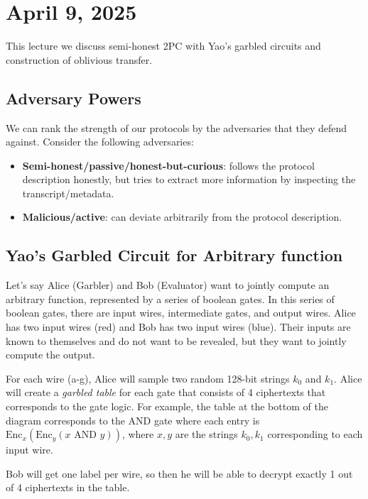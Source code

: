 \section{April 9, 2025}
\label{20250409}

This lecture we discuss semi-honest 2PC with Yao's garbled circuits and construction of oblivious transfer.

\subsection{Adversary Powers}
We can rank the strength of our protocols by the adversaries that they defend against. Consider the following adversaries:
\begin{itemize}
    \item \textbf{Semi-honest/passive/honest-but-curious}: follows the protocol description honestly, but tries to extract more information by inspecting the transcript/metadata.
    \item \textbf{Malicious/active}: can deviate arbitrarily from the protocol description.
\end{itemize}

\subsection{Yao's Garbled Circuit for Arbitrary function}

Let's say Alice (Garbler) and Bob (Evaluator) want to jointly compute an arbitrary function, represented by a series of boolean gates. In this series of boolean gates, there are input wires, intermediate gates, and output wires. Alice has two input wires (red) and Bob has two input wires (blue). Their inputs are known to themselves and do not want to be revealed, but they want to jointly compute the output.


For each wire (a-g), Alice will sample two random 128-bit strings $k_0$ and $k_1$. Alice will create a \textit{garbled table} for each gate that consists of 4 ciphertexts that corresponds to the gate logic. For example, the table at the bottom of the diagram corresponds to the AND gate where each entry is $\text{Enc}_x (\text{Enc}_y(x \text{ AND } y))$, where $x,y$ are the strings $k_0, k_1$ corresponding to each input wire.

Bob will get one label per wire, so then he will be able to decrypt exactly 1 out of 4 ciphertexts in the table.

